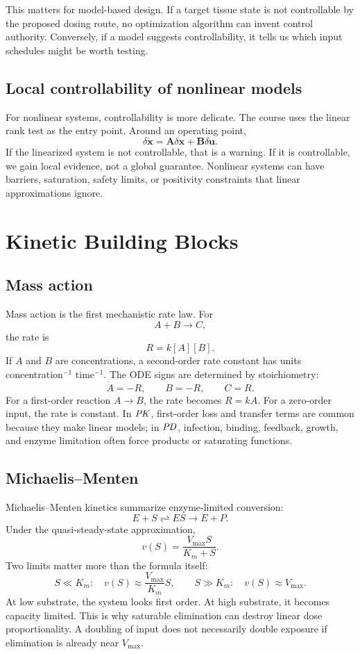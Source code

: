 \documentclass[a4paper]{article}
\newcommand{\vect}[1]{\boldsymbol{#1}}
\newcommand{\mat}[1]{\mathbf{#1}}
\newcommand{\A}{\mat A}
\newcommand{\B}{\mat B}
\newcommand{\PK}{\ensuremath{\pksym{PK}}}
\newcommand{\PD}{\ensuremath{\pksym{PD}}}
\newcommand{\Vmax}{V_{\max}}
\newcommand{\Km}{K_m}
\begin{document}
This matters for model-based design. If a target tissue state is not controllable by the proposed dosing route, no optimization algorithm can invent control authority. Conversely, if a model suggests controllability, it tells us which input schedules might be worth testing.

\subsection{Local controllability of nonlinear models}

For nonlinear systems, controllability is more delicate. The course uses the linear rank test as the entry point. Around an operating point,
\[
  \delta\dot{\vect x}=\A\delta\vect x+\B\delta\vect u.
\]
If the linearized system is not controllable, that is a warning. If it is controllable, we gain local evidence, not a global guarantee. Nonlinear systems can have barriers, saturation, safety limits, or positivity constraints that linear approximations ignore.

\section{Kinetic Building Blocks}

\subsection{Mass action}

Mass action is the first mechanistic rate law. For
\[
  A+B\longrightarrow C,
\]
the rate is
\[
  R=k[A][B].
\]
If \(A\) and \(B\) are concentrations, a second-order rate constant has units concentration\(^{-1}\) time\(^{-1}\). The ODE signs are determined by stoichiometry:
\[
  \dot A=-R,\qquad \dot B=-R,\qquad \dot C=R.
\]
For a first-order reaction \(A\to B\), the rate becomes \(R=kA\). For a zero-order input, the rate is constant. In \PK{}, first-order loss and transfer terms are common because they make linear models; in \PD{}, infection, binding, feedback, growth, and enzyme limitation often force products or saturating functions.

\subsection{Michaelis--Menten}

Michaelis--Menten kinetics summarize enzyme-limited conversion:
\[
  E+S \rightleftharpoons ES \longrightarrow E+P.
\]
Under the quasi-steady-state approximation,
\[
  v(S)=\frac{\Vmax S}{\Km+S}.
\]
Two limits matter more than the formula itself:
\[
  S\ll \Km:\quad v(S)\approx \frac{\Vmax}{\Km}S,
  \qquad
  S\gg \Km:\quad v(S)\approx \Vmax.
\]
At low substrate, the system looks first order. At high substrate, it becomes capacity limited. This is why saturable elimination can destroy linear dose proportionality. A doubling of input does not necessarily double exposure if elimination is already near \(\Vmax\).
\end{document}

